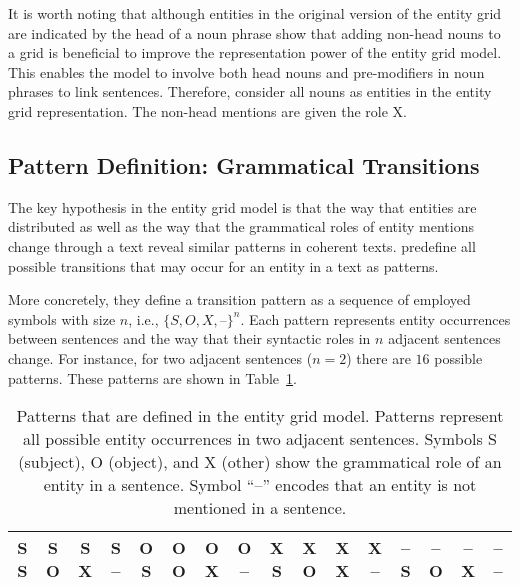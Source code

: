 It is worth noting that although entities in the original version of the entity grid are indicated by the head of a noun phrase 
 show that adding non-head nouns 
to a grid is beneficial to improve the representation power of the entity grid model. 
This enables the model to involve both head nouns and pre-modifiers in noun phrases to link sentences. 
Therefore,  consider all nouns 
as entities in the entity grid representation.  
The non-head mentions are given the role X. 

\subsection{Pattern Definition: Grammatical Transitions}

The key hypothesis in the entity grid model is that the way that entities are distributed as well as the way that the grammatical roles of entity mentions change through a text reveal similar patterns in coherent texts.  
 predefine all possible transitions that may occur for an entity in a text as patterns. 

More concretely, they define a transition pattern as a sequence of employed symbols with size $n$, i.e., $\{ S,O,X,\textit{--} \}^n$. 
Each pattern represents entity occurrences between sentences and the way that their syntactic roles in $n$ adjacent sentences change. 
For instance, for two adjacent sentences ($n=2$) there are $16$ possible patterns.
These patterns are shown in Table~\ref{table:rel-egrid-pattern}. 

\begin{table}[!ht]
	\begin{center}
		\resizebox{\columnwidth}{!}
		{%
			\begin{tabular}{@{}cccccccccccccccc@{}}
			\toprule
			S S & S O & S X & S -- & 
			O S & O O & O X & O -- & 
			X S & X O & X X & X -- & 
			-- S & -- O & -- X & -- -- 
			\\
			\bottomrule	
			\end{tabular}
		}%
	\end{center}
	\caption{
	Patterns that are defined in the entity grid model.  
	Patterns represent all possible entity occurrences in two adjacent sentences. 
	Symbols S (subject), O (object), and X (other) show the grammatical role of an entity in a sentence. Symbol ``--'' encodes that an entity is not mentioned in a sentence.
	}
	\label{table:rel-egrid-pattern}
\end{table}

